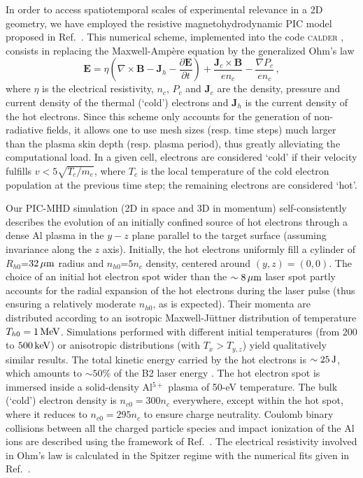 \documentclass[aps,twocolumn,showpacs,superscriptaddress]{revtex4}
\begin{document}
In order to access spatiotemporal scales of experimental relevance in a 2D geometry, we have employed the resistive magnetohydrodynamic PIC model proposed in Ref.~\cite{JCP_Cohen_2010}. This numerical scheme, implemented into the code \textsc{calder} \cite{NF_Lefebvre_2003}, consists in replacing the Maxwell-Amp\`ere equation by the generalized Ohm's law
\begin{equation} \label{eq:PICMHD}
  \mathbf{E}=\eta \left(\nabla \times \mathbf{B}-\mathbf{J}_h-\frac{\partial \mathbf{E}}{\partial t}\right)+\frac{\mathbf{J}_c\times \mathbf{B}}{en_c}
  -\frac{\nabla P_c}{en_c} \,,
\end{equation}
where $\eta$ is the electrical resistivity, $n_c$, $P_c$ and $\mathbf{J}_c$ are the density, pressure and current density of the thermal (`cold') electrons and $\mathbf{J}_h$ is the current density of the hot electrons. Since this scheme only accounts for the generation of non-radiative fields, it allows one to use mesh sizes (resp. time steps) much larger than the plasma skin depth (resp. plasma period), thus greatly alleviating the computational load. In a given cell, electrons are considered `cold' if their velocity fulfills $v<5\sqrt{T_c/m_e}$, where $T_c$ is the local temperature of the cold electron population at the previous time step; the remaining electrons are considered `hot'.

Our PIC-MHD simulation (2D in space and 3D in momentum) self-consistently describes the evolution of an initially confined source of hot electrons through a dense Al plasma in the $y-z$ plane parallel to the target surface (assuming invariance along the $z$ axis). Initially, the hot electrons uniformly fill a cylinder of $R_{h0}$=$32\,\rm \mu m$ radius and $n_{h0}$=$5n_c$ density, centered around $(y,z)=(0,0)$. The choice of an initial hot electron spot wider than the $\sim 8\,\rm \mu m$ laser spot partly accounts for the radial expansion of the hot electrons during the laser pulse \cite{PRE_Stephens_2004} (thus ensuring a relatively moderate $n_{h0}$, as is expected). Their momenta are distributed according to an isotropic Maxwell-J\"uttner distribution of temperature $T_{h0}=1\,\rm MeV$. Simulations performed with different initial temperatures (from $200$ to $500\,\rm keV$) or anisotropic distributions (with $T_x>T_{y,z}$) yield qualitatively similar results. The total kinetic energy carried by the hot electrons is $\sim 25\,\rm J$, which amounts to $\sim 50\%$ of the B2 laser energy \cite{PRL_Ping_2008}. The hot electron spot is immersed inside a solid-density Al$^{5+}$ plasma of \mbox{50-eV} temperature. The bulk (`cold') electron density is $n_{c0}=300n_c$ everywhere, except within the hot spot, where it reduces to $n_{c0}=295n_c$ to ensure charge neutrality. Coulomb binary collisions between all the charged particle species and impact ionization of the Al ions are described using the framework of Ref.~\cite{POP_Perez_2012}. The electrical resistivity involved in Ohm's law is calculated in the Spitzer regime with the numerical fits given in Ref.~\cite{Decoster_1998}. 
\end{document}

